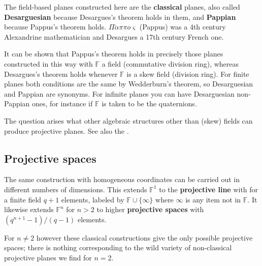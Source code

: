 \documentclass[12pt]{article}
\def\Fset{\mathbb{F}}
\def\omikron{o}
\begin{document}
The field-based planes constructed here are the {\bf classical} planes,
also called {\bf Desarguesian} because Desargues's theorem holds in them,
and {\bf Pappian} because Pappus's theorem holds.
$\Pi\acute\alpha\pi\pi\omikron\varsigma$ (Pappus) was a 4th century Alexandrine
mathematician and Desargues a 17th century French one.

It can be shown that Pappus's theorem holds in precisely those planes
constructed in this way with $\Fset$ a field (commutative division ring),
whereas Desargues's theorem holds whenever $\Fset$ is a skew field (division
ring). For finite planes both conditions are the same by Wedderburn's theorem,
so Desarguesian and Pappian are synonyms. For infinite planes you can have
Desarguesian non-Pappian ones, for instance if $\Fset$ is taken to be the
quaternions.

The question arises what other algebraic structures other than
(skew) fields can produce projective planes. See also the 
{\bf{}}.

\clearpage
\subsection*{Projective spaces}

The same construction with homogeneous coordinates can be carried out in different
numbers of dimensions. This extends $\Fset^1$ to the {\bf projective line} with
for a finite field $q+1$ elements, labeled by $\Fset\cup\{\infty\}$ where
$\infty$ is any item not in $\Fset$. It likewise extends $\Fset^n$ for
$n\gt2$ to higher {\bf projective spaces} with $(q^{n+1}-1)/(q-1)$ elements.

For $n\ne2$ however these classical constructions give the only possible
projective spaces; there is nothing corresponding to the wild variety of
non-classical projective planes we find for $n=2$.
\end{document}
